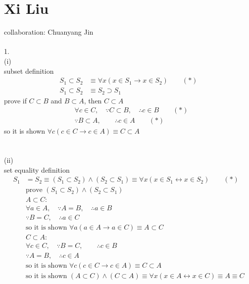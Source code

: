 \documentclass[12pt, border = 4pt, multi]{article} %
\begin{document}
\section*{Xi Liu}
collaboration: Chuanyang Jin\\
\\
1.\\
(i)\\
subset definition
\begin{align*}
S_1 \subset S_2 &\equiv \forall x (x \in S_1 \rightarrow x \in S_2) \qquad (*)\\
S_1 \subset S_2 &\equiv S_2 \supset S_1
\end{align*}
prove if $C \subset B$ and $B \subset A$, then $C \subset A$
\begin{align*}
&\forall c \in C, \quad\because C \subset B, \quad\therefore c \in B \qquad (*)\\
&\because B \subset A, \quad \quad\therefore c \in A \qquad (*)
\end{align*}
so it is shown $\forall c(c \in C \rightarrow c \in A) \equiv C \subset A$\\
\\
\\
(ii)\\
set equality definition
\begin{align*}
S_1 &= S_2 \equiv (S_1 \subset S_2) \wedge (S_2 \subset S_1) \equiv \forall x (x \in S_1 \leftrightarrow x \in S_2) \qquad (*)\\
&\text{prove } (S_1 \subset S_2) \wedge (S_2 \subset S_1)\\
&A \subset C:\\
&\forall a \in A, \quad\because A = B, \quad\therefore a \in B\\
&\because B = C, \quad\therefore a \in C\\
&\text{so it is shown } \forall a (a \in A \rightarrow a \in C) \equiv A \subset C\\
&C \subset A:\\
&\forall c \in C, \quad\because B = C, \qquad\therefore c \in B\\
&\because A = B, \quad\therefore c \in A\\
&\text{so it is shown } \forall c (c \in C \rightarrow c \in A) \equiv C \subset A\\
&\text{so it is shown } (A \subset C) \wedge (C \subset A) \equiv \forall x (x \in A \leftrightarrow x \in C) \equiv A \equiv C\\
\end{align*}
\\
\end{document}

